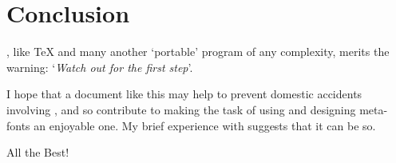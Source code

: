 \section{Conclusion}

\MF{}, like \TeX{} and many another `portable' program of any
complexity, merits the warning: `{\em Watch out for the first step\/}'.

I hope that a document like this may help to prevent domestic
accidents involving \MF{}, and so contribute to making the task
of using and designing meta-fonts an enjoyable one.  My brief
experience with \MF{} suggests that it can be so.


All the Best!


